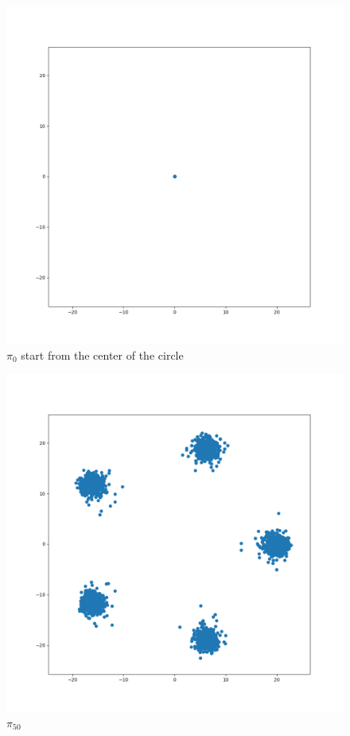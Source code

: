 \documentclass{article}
\begin{document}
\begin{figure}[h!]
\centering
\includegraphics[scale=0.3]{f0.png}
\caption{$\pi_{0}$ start from the center of the circle}
\end{figure}

\begin{figure}[h!]
\centering
\includegraphics[scale=0.3]{f50.png}
\caption{$\pi_{50}$}
\end{figure}
\end{document}
